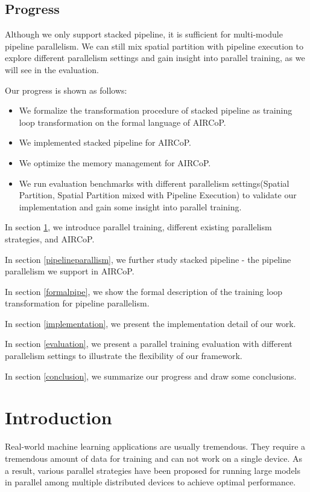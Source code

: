 \documentclass[sigplan, nonacm]{acmart}\settopmatter{printfolios=true,printccs=false,printacmref=false}
\begin{document}
\subsection{Progress}
Although we only support stacked pipeline, it is sufficient for multi-module pipeline parallelism. We can still mix spatial partition with pipeline execution to explore different parallelism settings and gain insight into parallel training, as we will see in the evaluation.\par
Our progress is shown as follows:
\begin{itemize}
  \item We formalize the transformation procedure of stacked pipeline as training loop transformation on the formal language of AIRCoP.
  \item We implemented stacked pipeline for AIRCoP.
  \item We optimize the memory management for AIRCoP.
  \item We run evaluation benchmarks with different parallelism settings(Spatial Partition, Spatial Partition mixed with Pipeline Execution) to validate our implementation and gain some insight into parallel training.
\end{itemize} \par
In section \ref{introduction}, we introduce parallel training, different existing parallelism strategies, and AIRCoP.\par
In section \ref{pipelineparallism}, we further study stacked pipeline - the pipeline parallelism we support in AIRCoP.\par
In section \ref{formalpipe}, we show the formal description of the training loop transformation for pipeline parallelism.\par
In section \ref{implementation}, we present the implementation detail of our work.\par
In section \ref{evaluation}, we present a parallel training evaluation with different parallelism settings to illustrate the flexibility of our framework.\par
In section \ref{conclusion}, we summarize our progress and draw some conclusions.
\section{Introduction} \label{introduction}
 Real-world machine learning applications are usually tremendous. They require a tremendous amount of data for training and can not work on a single device. As a result, various parallel strategies have been proposed for running large models in parallel among multiple distributed devices to achieve optimal performance.\par
\end{document}
